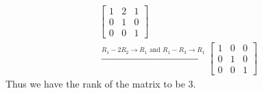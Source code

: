 \documentclass[answers,12pt,addpoints]{exam}
\begin{document}
\begin{questions}
\begin{solution}
\begin{align*}
\begin{bmatrix}
                1 & 2 & 1\\
                0 & 1 & 0\\
                0 & 0 & 1
            \end{bmatrix} \\
            \xrightarrow{R_1 - 2R_2 \to R_1 \text{ and } R_1 - R_3 \to R_1} \begin{bmatrix}
                1 & 0 & 0\\
                0 & 1 & 0\\
                0 & 0 & 1
            \end{bmatrix}
        \end{align*}
        Thus we have the rank of the matrix to be 3.\\
    \end{solution}


\end{questions}
\end{document}
